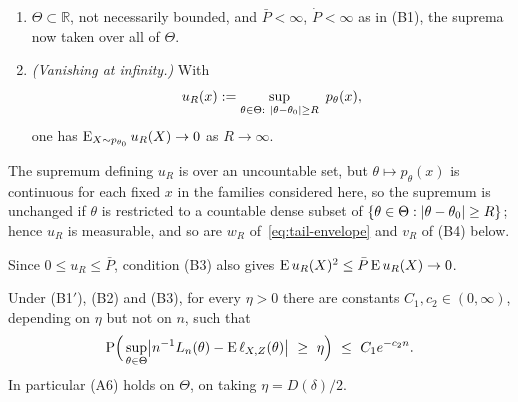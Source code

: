 \begin{enumerate}
	\item[(B1$'$)] $\Theta\subset\mathbb{R}$, not necessarily bounded, and $\bar P<\infty$, $\dot P<\infty$ as in (B1), the suprema now taken over all of $\Theta$.
	\item[(B3)] \emph{(Vanishing at infinity.)} With
	$$
	u_R(x):=\sup_{\theta\in\Theta:\ \abs{\theta-\theta_0}\ge R}\ p_\theta(x),
	$$
	one has $\mathrm{E}_{X\sim p_{\theta_0}}\,u_R(X)\to0$ as $R\to\infty$.
\end{enumerate}

The supremum defining $u_R$ is over an uncountable set, but $\theta\mapsto p_\theta(x)$ is continuous for each fixed $x$ in the families considered here, so the supremum is unchanged if $\theta$ is restricted to a countable dense subset of $\{\theta\in\Theta:\lvert\theta-\theta_0\rvert\ge R\}$; hence $u_R$ is measurable, and so are $w_R$ of~\eqref{eq:tail-envelope} and $v_R$ of (B4) below.

Since $0\le u_R\le\bar P$, condition (B3) also gives $\mathrm{E}\,u_R(X)^2\le\bar P\,\mathrm{E}\,u_R(X)\to0$.

\begin{prop}
\label{prop:a6-unbounded}
Under (B1$'$), (B2) and (B3), for every $\eta>0$ there are constants $C_1,c_2\in(0,\infty)$, depending on $\eta$ but not on $n$, such that
$$
\Prob\Big(\sup_{\theta\in\Theta}\abs*{n^{-1}L_n(\theta)-\E\,\ell_{X,Z}(\theta)}\ \ge\ \eta\Big)\ \le\ C_1 e^{-c_2 n}.
$$
In particular (A6) holds on $\Theta$, on taking $\eta=D(\delta)/2$.
\end{prop}


